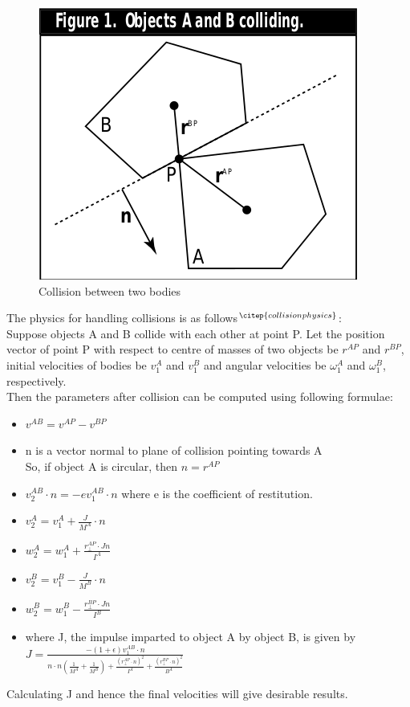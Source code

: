 \documentclass{article}
\begin{document}
\begin{figure}[h!]
    \centering
    \includegraphics[width=.5\textwidth]{collision.png}
    \caption{Collision between two bodies}
    
\end{figure}
The physics for handling collisions is as follows$^\citep{collisionphysics}$:\\
Suppose objects A and B collide with each other at point P.
Let the position vector of point P with respect to centre of masses of two objects be $r^{AP}$ and $r^{BP}$, initial velocities of bodies be $v_1^A$ and $v_1^B$ and angular velocities be $\omega_1^A$ and $\omega_1^B$, respectively.\\
Then the parameters after collision can be computed using following formulae:
\begin{itemize}
    \item $v^{AB} = v^{AP} - v^{BP}$\\
    \item n is a vector normal to plane of collision pointing towards A \\
    So, if object A is circular, then $n = r^{AP}$
    \item $v_2^{AB}\cdot n = -ev_1^{AB}\cdot n$ where e is the coefficient of restitution.\\
    \item $v_2^A = v_1^A + \frac{J}{M^A} \cdot n$
    \item $w_2^A = w_1^A + \frac{r_\perp^{AP}\cdot Jn}{I^A}$
    \item $v_2^B = v_1^B - \frac{J}{M^B} \cdot n$
    \item $w_2^B = w_1^B - \frac{r_\perp^{BP}\cdot Jn}{I^B}$
    \item where J, the impulse imparted to object A by object B, is given by \\$J = \frac{-(1+\epsilon)v_1^{AB}\cdot n}
    {n\cdot n (\frac{1}{M^A}+\frac{1}{M^B}) + \frac{({r_\perp^{AP}\cdot n})^2}{I^A} + \frac{({r_\perp^{BP}\cdot n})^2}{B^A}}$
\end{itemize}
Calculating J and hence the final velocities will give desirable results.
\end{document}
